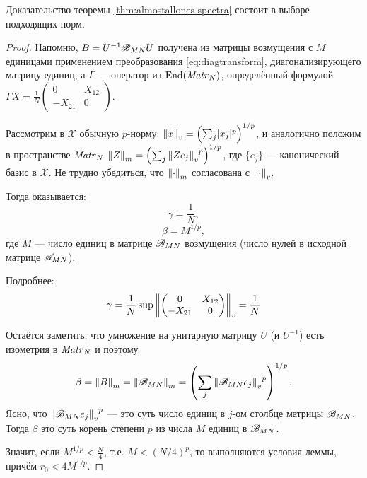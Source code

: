 Доказательство теоремы \ref{thm:almostallones-spectra}
состоит в выборе подходящих норм.
\begin{proof}
    Напомню, \( B = U^{-1} \perturbmatrix{M}{N} U \)
    получена из матрицы возмущения с \( M \) единицами применением преобразования \eqref{eq:diagtransform},
    диагонализирующего матрицу единиц,
    а \( \Gamma \) --- оператор из \( \End{\matr{N}{}} \),
    определённый формулой
    \( \Gamma X = \frac1N \begin{pmatrix}0 & X_{12} \\ -X_{21} & 0\end{pmatrix} \).

        Рассмотрим в \( \mathscr{X} \) обычную \(p\)-норму:
    \( \normex{v}{x} = \left(\sum_j \lvert x_j \rvert^p \right)^{1/p} \),
    и аналогично положим в пространстве \( \matr{N}{} \)
    \( \normex{m}{Z} = \left( \sum_j {\normex{v}{Z e_j}}^p \right)^{1/p} \),
    где \( \{ e_j \} \) --- канонический базис в \( \mathscr{X} \).
    Не трудно убедиться, что \( \normex{m}{\cdot} \) согласована с \( \normex{v}{\cdot} \).

    Тогда оказывается:
    \[ \gamma = \frac1N, \]
    \[  \beta = M^{1/p} ,\]
    где \( M \) --- число единиц в матрице \( \perturbmatrix{M}{N} \) возмущения
    (число нулей в исходной матрице \( \almostallones{M}{N} \)).

    Подробнее:
    \[ \gamma = \frac1N \sup\normex{v}{\begin{pmatrix}0 & X_{12} \\ -X_{21} & 0\end{pmatrix}} = \frac1N \]

    Остаётся заметить, что умножение на унитарную матрицу \( U \)
    (и \( U^{-1} \)) есть изометрия
    в \( \matr{N}{} \)
    и поэтому
    \[ \beta = \normex{m}{B} = \normex{m}{\perturbmatrix{M}{N}} = \left(\sum_j{\normex{v}{\perturbmatrix{M}{N}e_j}}^p\right)^{1/p}.\]
    Ясно, что \( {\normex{v}{\perturbmatrix{M}{N}e_j}}^p \) --- это суть число единиц в \( j \)-ом столбце
    матрицы \( \perturbmatrix{M}{N} \).
    Тогда \( \beta \) это суть корень степени \( p \) из числа \( M \) единиц в \( \perturbmatrix{M}{N} \).

    Значит, если
    \( M^{1/p} < \frac{N}{4} \), т.е. \( M < \left(N/4\right)^p \),
    то выполняются условия леммы,
    причём \( r_0 < 4M^{1/p} \).
\end{proof}
